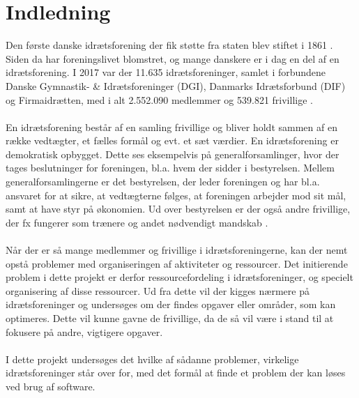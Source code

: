 \chapter{Indledning}\label{ch:introduction}
Den første danske idrætsforening der fik støtte fra staten blev stiftet i 1861 \cite{difhistorie}.\\
Siden da har foreningslivet blomstret, og mange danskere er i dag en del af en idrætsforening. I 2017 var der 11.635 idrætsforeninger, samlet i forbundene Danske Gymnastik- \& Idrætsforeninger (DGI), Danmarks Idrætsforbund (DIF) og Firmaidrætten, med i alt 2.552.090 medlemmer og 539.821 frivillige \cite{fester2018}.
\\\\
En idrætsforening består af en samling frivillige og bliver holdt sammen af en række vedtægter, et fælles formål og evt. et sæt værdier. En idrætsforening er demokratisk opbygget. Dette ses eksempelvis på generalforsamlinger, hvor der tages beslutninger for foreningen, bl.a. hvem der sidder i bestyrelsen. Mellem generalforsamlingerne er det bestyrelsen, der leder foreningen og har bl.a. ansvaret for at sikre, at vedtægterne følges, at foreningen arbejder mod sit mål, samt at have styr på økonomien. Ud over bestyrelsen er der også andre frivillige, der fx fungerer som trænere og andet nødvendigt mandskab \citep{DGI} \citep{bestyrelsen}.
\\\\
Når der er så mange medlemmer og frivillige i idrætsforeningerne, kan der nemt opstå problemer med organiseringen af aktiviteter og ressourcer. Det initierende problem i dette projekt er derfor ressourcefordeling i idrætsforeninger, og specielt organisering af disse ressourcer.
Ud fra dette vil der kigges nærmere på idrætsforeninger og undersøges om der findes opgaver eller områder, som kan optimeres. Dette vil kunne gavne de frivillige, da de så vil være i stand til at fokusere på andre, vigtigere opgaver. 
\\\\
I dette projekt undersøges det hvilke af sådanne problemer, virkelige idrætsforeninger står over for, med det formål at finde et problem der kan løses ved brug af software.




